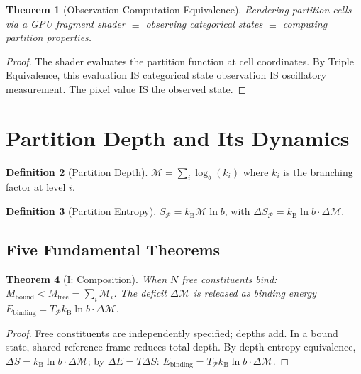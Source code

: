 \documentclass[11pt,twocolumn,a4paper]{article}
\newtheorem{theorem}{Theorem}[section]
\theoremstyle{definition}
\newtheorem{definition}[theorem]{Definition}
\theoremstyle{remark}
\newcommand{\kB}{k_{\mathrm{B}}}
\newcommand{\Depth}{\mathcal{M}}
\newcommand{\Mfree}{M_{\mathrm{free}}}
\newcommand{\Mbound}{M_{\mathrm{bound}}}
\begin{document}
\begin{theorem}[Observation-Computation Equivalence]
\label{thm:obs_comp}
Rendering partition cells via a GPU fragment shader $\equiv$ observing categorical states $\equiv$ computing partition properties.
\end{theorem}

\begin{proof}
The shader evaluates the partition function at cell coordinates. By Triple Equivalence, this evaluation IS categorical state observation IS oscillatory measurement. The pixel value IS the observed state.
\end{proof}

\section{Partition Depth and Its Dynamics}
\label{sec:depth}

\begin{definition}[Partition Depth]
$\Depth = \sum_{i} \log_b(k_i)$ where $k_i$ is the branching factor at level $i$.
\end{definition}

\begin{definition}[Partition Entropy]
$S_{\mathcal{P}} = \kB \Depth \ln b$, with $\Delta S_{\mathcal{P}} = \kB \ln b \cdot \Delta\Depth$.
\end{definition}

\subsection{Five Fundamental Theorems}

\begin{theorem}[I: Composition]
\label{thm:composition}
When $N$ free constituents bind: $\Mbound < \Mfree = \sum_i \Depth_i$. The deficit $\Delta\Depth$ is released as binding energy $E_{\mathrm{binding}} = T_{\mathcal{P}} \kB \ln b \cdot \Delta\Depth$.
\end{theorem}

\begin{proof}
Free constituents are independently specified; depths add. In a bound state, shared reference frame reduces total depth. By depth-entropy equivalence, $\Delta S = \kB \ln b \cdot \Delta\Depth$; by $\Delta E = T\Delta S$: $E_{\mathrm{binding}} = T_{\mathcal{P}}\kB\ln b\cdot\Delta\Depth$.
\end{proof}
\end{document}
